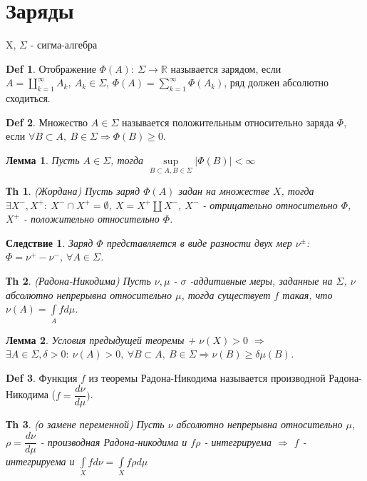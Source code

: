 \documentclass[14pt]{article}
\theoremstyle{plain}
\newtheorem{Thm}{Тh}
\newtheorem{Lem}{Лемма}
\newtheorem{Sled}{Следствие}
\theoremstyle{definition}
\newtheorem{Def}{Def}
\begin{document}
	\section{Заряды}
		X, $\Sigma$ - сигма-алгебра
		\begin{Def}
			Отображение $\Phi(A): \ \Sigma \to \mathbb{R}$ называется зарядом, если $A = \coprod\limits_{k=1}^{\infty} A_k, \ A_k \in \Sigma$, $\Phi(A) = \sum\limits_{k=1}^{\infty} \Phi(A_k)$, ряд должен абсолютно сходиться. 
		\end{Def}
		\begin{Def}
			Множество $A \in \Sigma$ называется положительным относительно заряда $\Phi$, если $\forall B \subset A, \ B \in \Sigma \Rightarrow \Phi(B) \geq 0$. 
		\end{Def}
		\begin{Lem}
			Пусть $A \in \Sigma$, тогда $\sup\limits_{B \subset A, B\in \Sigma}|\Phi(B)| < \infty$
		\end{Lem}
		\begin{Thm}
			(Жордана)\newline
			Пусть заряд $\Phi(A)$ задан на множестве $X$, тогда $\exists X^{-}, X^{+}: \ X^{-} \cap X^{+} = \emptyset$, $X = X^{+} \coprod X^{-}$, $X^{-}$ - отрицательно относительно $\Phi$, $X^{+}$ - положительно относительно $\Phi$.  
		\end{Thm}
		\begin{Sled}
			Заряд $\Phi$ представляется в виде разности двух мер $\nu^{\pm}$: $\Phi = \nu^{+} - \nu^{-}$, $\forall A \in \Sigma$.  
		\end{Sled}
		\begin{Thm}
			(Радона-Никодима)\newline
			Пусть $\nu, \mu$ - $\sigma$ -аддитивные меры, заданные на $\Sigma$,  $\nu$ абсолютно непрерывна относительно $\mu$, тогда существует $f$ такая, что  $\nu(A) = \int\limits_A f d\mu$. 
		\end{Thm}
		\begin{Lem}
			Условия предыдущей теоремы + $\nu(X) > 0$ $\Rightarrow$ $\exists A \in \Sigma, \delta > 0: \ \nu(A) > 0, \ \forall B \subset A, \ B \in \Sigma \Rightarrow \nu(B) \geq \delta \mu(B)$. 
		\end{Lem}
		\begin{Def}
			Функция $f$ из теоремы Радона-Никодима называется производной Радона-Никодима ($f = \dfrac{d\nu}{d\mu})$.
		\end{Def}
		\begin{Thm}
			(о замене переменной) \newline
			Пусть $\nu$ абсолютно непрерывна относительно $\mu$, $\rho = \dfrac{d\nu}{d\mu}$ - производная Радона-никодима и $f\rho$ - интегрируема $\Rightarrow$ $f$ - интегрируема и $\int\limits_X f d\nu = \int\limits_X f\rho d\mu$
		\end{Thm}
\end{document}
